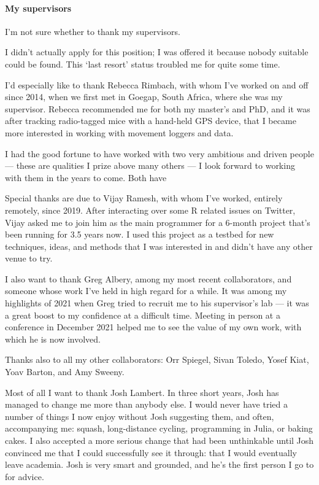 \paragraph*{My supervisors}

I'm not sure whether to thank my supervisors.

I didn't actually apply for this position; I was offered it because nobody suitable could be found.
This `last resort' status troubled me for quite some time.



I'd especially like to thank Rebecca Rimbach, with whom I've worked on and off since 2014, when we first met in Goegap, South Africa, where she was my supervisor.
Rebecca recommended me for both my master's and PhD, and it was after tracking radio-tagged mice with a hand-held GPS device, that I became more interested in working with movement loggers and data.

\medskip

I had the good fortune to have worked with two very ambitious and driven people --- these are qualities I prize above many others --- I look forward to working with them in the years to come.
Both have 

Special thanks are due to Vijay Ramesh, with whom I've worked, entirely remotely, since 2019.
After interacting over some R related issues on Twitter, Vijay asked me to join him as the main programmer for a 6-month project that's been running for 3.5 years now.
I used this project as a testbed for new techniques, ideas, and methods that I was interested in and didn't have any other venue to try.

I also want to thank Greg Albery, among my most recent collaborators, and someone whose work I've held in high regard for a while.
It was among my highlights of 2021 when Greg tried to recruit me to his supervisor's lab --- it was a great boost to my confidence at a difficult time.
Meeting in person at a conference in December 2021 helped me to see the value of my own work, with which he is now involved.

Thanks also to all my other collaborators: Orr Spiegel, Sivan Toledo, Yosef Kiat, Yoav Barton, and Amy Sweeny.

\medskip

Most of all I want to thank Josh Lambert.
In three short years, Josh has managed to change me more than anybody else.
I would never have tried a number of things I now enjoy without Josh suggesting them, and often, accompanying me: squash, long-distance cycling, programming in Julia, or baking cakes.
I also accepted a more serious change that had been unthinkable until Josh convinced me that I could successfully see it through: that I would eventually leave academia.
Josh is very smart and grounded, and he's the first person I go to for advice.

\endgroup
